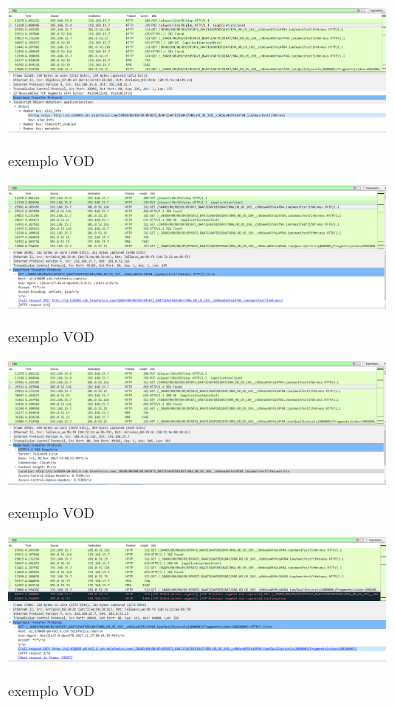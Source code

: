 \begin{figure}[h]
\caption{exemplo VOD}
\includegraphics[width=10cm]{Figuras/exemplo_vod_1.png} 
\label{figura:exemplo_vod_1}
\end{figure}

\begin{figure}[h]
\caption{exemplo VOD}
\includegraphics[width=10cm]{Figuras/exemplo_vod_2.png} 
\label{figura:exemplo_vod_2}
\end{figure}

\begin{figure}[h]
\caption{exemplo VOD}
\includegraphics[width=10cm]{Figuras/exemplo_vod_3.png} 
\label{figura:exemplo_vod_3}
\end{figure}

\begin{figure}[h]
\caption{exemplo VOD}
\includegraphics[width=10cm]{Figuras/exemplo_vod_4.png} 
\label{figura:exemplo_vod_4}
\end{figure}